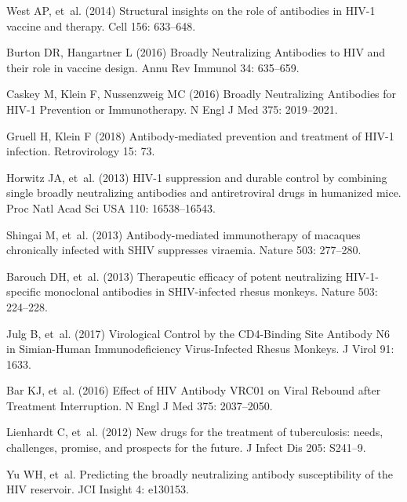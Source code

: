 \documentclass[aps,prx,noshowpacs,twocolumn,nofootinbib]{revtex4-2}
\begin{document}
\begin{thebibliography}{10}
West AP, et~al. (2014) {Structural insights on the role of antibodies in HIV-1
  vaccine and therapy.}
\newblock Cell 156: 633--648.

Burton DR, Hangartner L (2016) {Broadly Neutralizing Antibodies to HIV and
  their role in vaccine design.}
\newblock Annu Rev Immunol 34: 635--659.

Caskey M, Klein F, Nussenzweig MC (2016) {Broadly Neutralizing Antibodies for
  HIV-1 Prevention or Immunotherapy}.
\newblock N Engl J Med 375: 2019--2021.

Gruell H, Klein F (2018) {Antibody-mediated prevention and treatment of HIV-1
  infection.}
\newblock Retrovirology 15: 73.

Horwitz JA, et~al. (2013) {HIV-1 suppression and durable control by combining
  single broadly neutralizing antibodies and antiretroviral drugs in humanized
  mice.}
\newblock Proc Natl Acad Sci USA 110: 16538--16543.

Shingai M, et~al. (2013) {Antibody-mediated immunotherapy of macaques
  chronically infected with SHIV suppresses viraemia.}
\newblock Nature 503: 277--280.

Barouch DH, et~al. (2013) {Therapeutic efficacy of potent neutralizing
  HIV-1-specific monoclonal antibodies in SHIV-infected rhesus monkeys.}
\newblock Nature 503: 224--228.

Julg B, et~al. (2017) {Virological Control by the CD4-Binding Site Antibody N6
  in Simian-Human Immunodeficiency Virus-Infected Rhesus Monkeys.}
\newblock J Virol 91: 1633.

Bar KJ, et~al. (2016) {Effect of HIV Antibody VRC01 on Viral Rebound after
  Treatment Interruption.}
\newblock N Engl J Med 375: 2037--2050.

Lienhardt C, et~al. (2012) {New drugs for the treatment of tuberculosis: needs,
  challenges, promise, and prospects for the future.}
\newblock J Infect Dis 205: S241--9.

Yu WH, et~al. Predicting the broadly neutralizing antibody susceptibility of
  the {{HIV}} reservoir.
\newblock JCI Insight 4: e130153.


\end{thebibliography}
\end{document}
